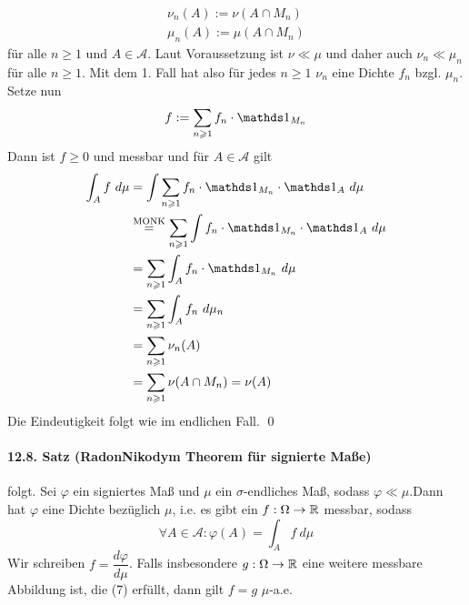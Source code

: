 \documentclass[11pt]{report}
\begin{document}
     \begin{gather*}
         \nu_n(A):=\nu(A\cap M_n) \\
         \mu_n(A):=\mu(A\cap M_n)
     \end{gather*}
     f\"ur alle $n\geq1$ und $A\in\mathcal{A}$. Laut Voraussetzung ist $\nu\ll\mu$ und daher auch $\nu_n\ll\mu_n$ f\"ur alle $n\geq1$. Mit dem 1. Fall hat also f\"ur jedes $n\geq1$ $\nu_n$ eine Dichte $f_n$ bzgl. $\mu_n$. Setze nun 
     $$f:=\sum_{n\geq1}f_n\cdot\ind{M_n}$$
     Dann ist $f\geq0$ und messbar und f\"ur $A\in\mathcal{A}$ gilt
     \begin{align*}
         \int_A f\ d\mu&=\int\sum_{n\geq1}f_n\cdot\ind{M_n}\cdot\ind{A}\ d\mu\\
         &\overset{\text{MONK}}{=}\sum_{n\geq1}\int f_n\cdot\ind{M_n}\cdot\ind{A}\ d\mu \\
         &=\sum_{n\geq1}\int_A f_n\cdot\ind{M_n}\ d\mu \\
         &=\sum_{n\geq1}\int_A f_n\ d\mu_n\\
         &=\sum_{n\geq1}\nu_n(A)\\
         &=\sum_{n\geq1}\nu(A\cap M_n)=\nu(A)
     \end{align*}
     Die Eindeutigkeit folgt wie im endlichen Fall. \qed
     
     \paragraph{12.8. Satz (Radon\textendash Nikodym Theorem f\"ur signierte Ma\ss{}e)} folgt.
     Sei $\varphi$ ein signiertes Maß und $\mu$ ein $\sigma$-endliches Maß, sodass $\varphi\ll\mu$.Dann hat $\varphi$ eine Dichte bez\"uglich $\mu$, i.e. es gibt ein $f:\Omega\to\mathbb{R}$ messbar, sodass
     \begin{equation*}
         \forall A\in\mathcal{A}: \varphi(A)=\int_A f \ d\mu
     \end{equation*}
     Wir schreiben $f=\dfrac{d\varphi}{d\mu}$. Falls insbesondere $g:\Omega\to\mathbb{R}$ eine weitere messbare Abbildung ist, die (7) erf\"ullt, dann gilt $f=g$ $\mu$-a.e.
     
\end{document}
